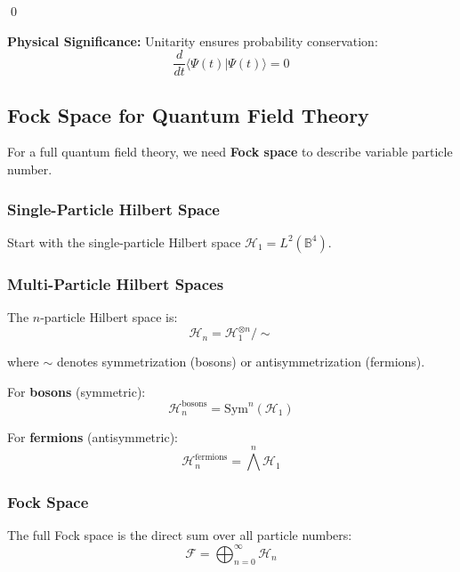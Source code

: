 \qed

\textbf{Physical Significance:} Unitarity ensures probability conservation:
\begin{equation}
\frac{d}{dt} \langle \Psi(t) | \Psi(t) \rangle = 0
\end{equation}

\subsection{Fock Space for Quantum Field Theory}

For a full quantum field theory, we need \textbf{Fock space} to describe variable particle number.

\subsubsection{Single-Particle Hilbert Space}

Start with the single-particle Hilbert space $\mathcal{H}_1 = L^2(\mathbb{B}^4)$.

\subsubsection{Multi-Particle Hilbert Spaces}

The $n$-particle Hilbert space is:
\begin{equation}
\mathcal{H}_n = \mathcal{H}_1^{\otimes n} / \sim
\end{equation}

where $\sim$ denotes symmetrization (bosons) or antisymmetrization (fermions).

For \textbf{bosons} (symmetric):
\begin{equation}
\mathcal{H}_n^{\text{bosons}} = \text{Sym}^n(\mathcal{H}_1)
\end{equation}

For \textbf{fermions} (antisymmetric):
\begin{equation}
\mathcal{H}_n^{\text{fermions}} = \bigwedge^n \mathcal{H}_1
\end{equation}

\subsubsection{Fock Space}

The full Fock space is the direct sum over all particle numbers:
\begin{equation}
\mathcal{F} = \bigoplus_{n=0}^{\infty} \mathcal{H}_n
\end{equation}

